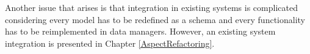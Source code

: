 Another issue that arises is that integration in existing systems is complicated considering every model has to be redefined as a schema and every functionality has to be reimplemented in data managers.
However, an existing system integration is presented in Chapter \ref{AspectRefactoring}.

